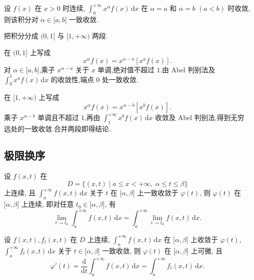 \begin{example}
    设 $f(x)$ 在 $x>0$ 时连续, $\displaystyle\int_0^{+\infty}x^\alpha f(x)\,\mathrm{d}x$ 在 $\alpha=a$ 和 $\alpha=b$ $(a<b)$ 时收敛, 则该积分对 $\alpha\in\lbrack a,b\rbrack$ 一致收敛.
\end{example}
\exampleblank

\begin{solution}
    把积分分成 $(0,1\rbrack$ 与 $\lbrack1,+\infty)$ 两段.

    在 $(0,1\rbrack$ 上写成
    \[
        x^\alpha f(x)=x^{\alpha-a}[x^af(x)].
    \]
    对 $\alpha\in\lbrack a,b\rbrack$,乘子 $x^{\alpha-a}$ 关于 $x$ 单调,绝对值不超过 $1$.由 Abel 判别法及
    $\displaystyle\int_0^1x^af(x)\,\mathrm{d}x$ 的收敛性,端点 $0$ 处一致收敛.

    在 $\lbrack1,+\infty)$ 上写成
    \[
        x^\alpha f(x)=x^{\alpha-b}[x^bf(x)].
    \]
    乘子 $x^{\alpha-b}$ 单调且不超过 $1$,再由
    $\displaystyle\int_1^{+\infty}x^bf(x)\,\mathrm{d}x$ 收敛及 Abel 判别法,得到无穷远处的一致收敛.合并两段即得结论.
\end{solution}



\subsection{极限换序}

\begin{theorem}
    设 $f(x,t)$ 在
    \[
        D=\{(x,t)\mid a\leq x<+\infty,\ \alpha\leq t\leq\beta\}
    \]
    上连续, 且 $\displaystyle\int_a^{+\infty}f(x,t)\,\mathrm{d}x$ 关于 $t$ 在 $\lbrack\alpha,\beta\rbrack$ 上一致收敛于 $\varphi(t)$, 则 $\varphi(t)$ 在 $\lbrack\alpha,\beta\rbrack$ 上连续, 即对任意 $t_0\in\lbrack\alpha,\beta\rbrack$, 有
    \[
        \displaystyle\lim\limits_{t\to t_0}\int_a^{+\infty}f(x,t)\,\mathrm{d}x
        =\int_a^{+\infty}\lim\limits_{t\to t_0}f(x,t)\,\mathrm{d}x.
    \]
\end{theorem}

\begin{theorem}
    设 $f(x,t),f_t(x,t)$ 在 $D$ 上连续, $\displaystyle\int_a^{+\infty}f(x,t)\,\mathrm{d}x$ 在 $\lbrack\alpha,\beta\rbrack$ 上收敛于 $\varphi(t)$, $\displaystyle\int_a^{+\infty}f_t(x,t)\,\mathrm{d}x$ 关于 $t\in\lbrack\alpha,\beta\rbrack$ 一致收敛, 则 $\varphi(t)$ 在 $\lbrack\alpha,\beta\rbrack$ 上可微, 且
    \[
        \varphi'(t)=\dfrac{\mathrm{d}}{\mathrm{d}t}\int_a^{+\infty}f(x,t)\,\mathrm{d}x
        =\int_a^{+\infty}f_t(x,t)\,\mathrm{d}x.
    \]
\end{theorem}

